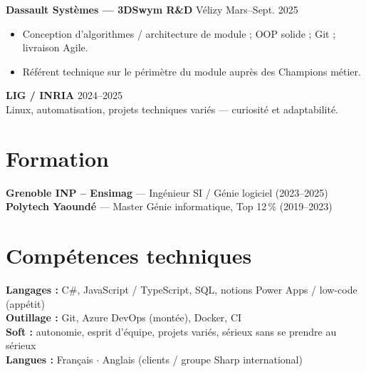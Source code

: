 \documentclass[10pt,a4paper]{article}
\begin{document}
\textbf{Dassault Syst\`emes --- 3DSwym R\&D} \hfill V\'elizy \hfill Mars--Sept. 2025
\begin{itemize}
  \item Conception d'algorithmes / architecture de module ; OOP solide ; Git ; livraison Agile.
  \item R\'ef\'erent technique sur le p\'erim\`etre du module aupr\`es des Champions m\'etier.
\end{itemize}

\textbf{LIG / INRIA} \hfill 2024--2025\\
Linux, automatisation, projets techniques vari\'es --- curiosit\'e et adaptabilit\'e.

\section{Formation}
\textbf{Grenoble INP -- Ensimag} --- Ing\'enieur SI / G\'enie logiciel (2023--2025)\\
\textbf{Polytech Yaound\'e} --- Master G\'enie informatique, Top 12\,\% (2019--2023)

\section{Comp\'etences techniques}
\textbf{Langages :} C\#, JavaScript / TypeScript, SQL, notions Power Apps / low-code (app\'etit)\\
\textbf{Outillage :} Git, Azure DevOps (mont\'ee), Docker, CI\\
\textbf{Soft :} autonomie, esprit d'\'equipe, projets vari\'es, s\'erieux sans se prendre au s\'erieux\\
\textbf{Langues :} Fran\c{c}ais $\cdot$ Anglais (clients / groupe Sharp international)
\end{document}
